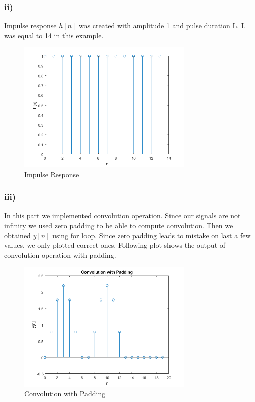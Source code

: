 \documentclass[letterpaper,12pt]{article}
\begin{document}
\subsubsection{ii)}
Impulse response \(h[n]\) was created with amplitude 1 and pulse duration L. L was equal to 14 in this example.
\begin{figure}[H]
    \centering
    \includegraphics[width = 0.75\textwidth]{i2.png}
    \caption{Impulse Response}
    \end{figure} 
    
\subsubsection{iii)}
In this part we implemented convolution operation. Since our signals are not infinity we used zero padding to be able to compute convolution. Then we obtained \(y[n]\) using for loop. Since zero padding leads to mistake on last a few values, we only plotted correct ones. Following plot shows the output of convolution operation with padding.
\begin{figure}[H]
    \centering
    \includegraphics[width = 0.75\textwidth]{convwithpadding.png}
    \caption{Convolution with Padding}
    \end{figure} 
    
\end{document}
